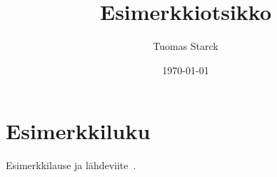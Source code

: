 \documentclass[finnish]{tktltiki2}
\title{Esimerkkiotsikko}
\author{Tuomas Starck}
\date{\today}
\theoremstyle{definition}
\theoremstyle{remark}
\begin{document}
\frontmatter

\maketitle
\makeabstract

\tableofcontents

\mainmatter

\section{Esimerkkiluku}


Esimerkkilause ja lähdeviite~\cite{esimerkki}.



\end{document}
